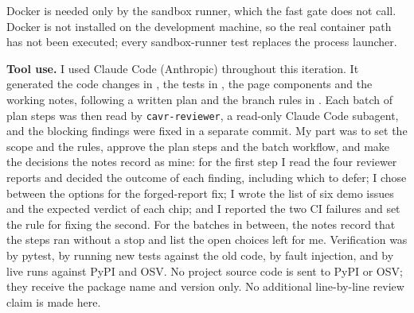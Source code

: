 \begin{sloppypar}
Docker is needed only by the sandbox runner, which the fast gate does not call. Docker is not installed on the development machine, so the real container path has not been executed; every sandbox-runner test replaces the process launcher.
\end{sloppypar}

\begin{sloppypar}
\textbf{Tool use.} I used Claude Code (Anthropic) throughout this iteration. It generated the code changes in , the tests in , the page components and the working notes, following a written plan and the branch rules in . Each batch of plan steps was then read by \texttt{cavr-reviewer}, a read-only Claude Code subagent, and the blocking findings were fixed in a separate commit. My part was to set the scope and the rules, approve the plan steps and the batch workflow, and make the decisions the notes record as mine: for the first step I read the four reviewer reports and decided the outcome of each finding, including which to defer; I chose between the options for the forged-report fix; I wrote the list of six demo issues and the expected verdict of each chip; and I reported the two CI failures and set the rule for fixing the second. For the batches in between, the notes record that the steps ran without a stop and list the open choices left for me. Verification was by pytest, by running new tests against the old code, by fault injection, and by live runs against PyPI and OSV. No project source code is sent to PyPI or OSV; they receive the package name and version only. No additional line-by-line review claim is made here.
\end{sloppypar}

